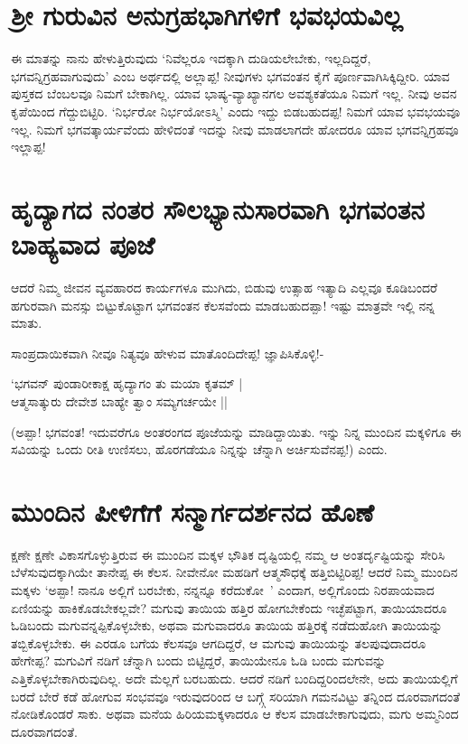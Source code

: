 \section*{ಶ್ರೀ ಗುರುವಿನ ಅನುಗ್ರಹಭಾಗಿಗಳಿಗೆ ಭವಭಯವಿಲ್ಲ}

ಈ ಮಾತನ್ನು ನಾನು ಹೇಳುತ್ತಿರುವುದು `ನಿವೆಲ್ಲರೂ ಇದಕ್ಕಾಗಿ ದುಡಿಯಲೇಬೇಕು, ಇಲ್ಲದಿದ್ದರೆ, ಭಗವನ್ನಿಗ್ರಹವಾಗುವುದು' ಎಂಬ ಅರ್ಥದಲ್ಲಿ ಅಲ್ಲಾಪ್ಪ! ನೀವುಗಳು ಭಗವಂತನ ಕೈಗೆ ಪೂರ್ಣವಾಗಿಸಿಕ್ಕಿದ್ದೀರಿ. ಯಾವ ಪುಸ್ತಕದ ಬೆಂಬಲವೂ ನಿಮಗೆ ಬೇಕಾಗಿಲ್ಲ. ಯಾವ ಭಾಷ್ಯ-ವ್ಯಾಖ್ಯಾನಗಲ ಅವಶ್ಯಕತೆಯೂ ನಿಮಗೆ ಇಲ್ಲ. ನೀವು ಅವನ ಕೃಪೆಯಿಂದ ಗೆದ್ದುಬಿಟ್ಟಿರಿ. `ನಿರ್ಭರೋ ನಿರ್ಭಯೋಽಸ್ಮಿ'\label{115} ಎಂದು ಇದ್ದು ಬಿಡಬಹುದಪ್ಪ! ನಿಮಗೆ ಯಾವ ಭವಭಯವೂ ಇಲ್ಲ. ನಿಮಗೆ ಭಗವತ್ಕಾರ್ಯವೆಂದು ಹೇಳಿದಂತೆ ಇದನ್ನು ನೀವು ಮಾಡಲಾಗದೇ ಹೋದರೂ ಯಾವ ಭಗವನ್ನಿಗ್ರಹವೂ ಇಲ್ಲಾಪ್ಪ!

\section*{ಹೃದ್ಯಾಗದ ನಂತರ ಸೌಲಭ್ಯಾನುಸಾರವಾಗಿ ಭಗವಂತನ ಬಾಹ್ಯವಾದ ಪೂಜೆ}

ಆದರೆ ನಿಮ್ಮ ಜೀವನ ವ್ಯವಹಾರದ ಕಾರ್ಯಗಳೂ ಮುಗಿದು, ಬಿಡುವು ಉತ್ಸಾಹ ಇತ್ಯಾದಿ ಎಲ್ಲವೂ ಕೂಡಿಬಂದರೆ ಹಗುರವಾಗಿ ಮನಸ್ಸು ಬಿಟ್ಟುಕೊಟ್ಟಾಗ ಭಗವಂತನ ಕೆಲಸವೆಂದು ಮಾಡಬಹುದಪ್ಪಾ! ಇಷ್ಟು ಮಾತ್ರವೇ ಇಲ್ಲಿ ನನ್ನ ಮಾತು.

ಸಾಂಪ್ರದಾಯಿಕವಾಗಿ ನೀವೂ ನಿತ್ಯವೂ ಹೇಳುವ ಮಾತೊಂದಿದೇಪ್ಪ! ಜ್ಞಾಪಿಸಿಕೊಳ್ಳಿ!-

\begin{shloka}
`ಭಗವನ್ ಪುಂಡಾರೀಕಾಕ್ಷ ಹೃದ್ಯಾಗಂ ತು ಮಯಾ ಕೃತಮ್ |\\
ಆತ್ಮಸಾತ್ಕುರು ದೇವೇಶ ಬಾಹ್ಯೇ ತ್ವಾಂ ಸಮ್ಯಗರ್ಚಯೇ ||
\end{shloka}

(ಅಪ್ಪಾ! ಭಗವಂತ! ಇದುವರೆಗೂ ಅಂತರಂಗದ ಪೂಜೆಯನ್ನು ಮಾಡಿದ್ದಾಯಿತು. ಇನ್ನು ನಿನ್ನ ಮುಂದಿನ ಮಕ್ಕಳಿಗೂ ಈ ಸವಿಯನ್ನು ಒಂದು ರೀತಿ ಉಣಿಸಲು, ಹೊರಗಡೆಯೂ ನಿನ್ನನ್ನು ಚೆನ್ನಾಗಿ ಅರ್ಚಿಸುವೆನಪ್ಪ!) ಎಂದು.

\section*{ಮುಂದಿನ ಪೀಳಿಗೆಗೆ ಸನ್ಮಾರ್ಗದರ್ಶನದ ಹೊಣೆ}

ಕ್ಷಣೇ ಕ್ಷಣೇ ವಿಕಾಸಗೊಳ್ಳುತ್ತಿರುವ ಈ ಮುಂದಿನ ಮಕ್ಕಳ ಭೌತಿಕ ದೃಷ್ಟಿಯಲ್ಲಿ ನಮ್ಮ ಆ ಅಂತರ್ದೃಷ್ಟಿಯನ್ನು ಸೇರಿಸಿ ಬೆಳೆಸುವುದಕ್ಕಾಗಿಯೇ ತಾನೇಪ್ಪ ಈ ಕೆಲಸ. ನೀವೇನೋ ಮಹಡಿಗೆ ಆತ್ಮಸೌಧಕ್ಕೆ ಹತ್ತಿಬಿಟ್ಟಿರಿಪ್ಪ! ಆದರೆ ನಿಮ್ಮ ಮುಂದಿನ ಮಕ್ಕಳು `ಅಪ್ಪಾ! ನಾನೂ ಅಲ್ಲಿಗೆ ಬರಬೇಕು, ನನ್ನನ್ನೂ ಕರೆದುಕೋ~' ಎಂದಾಗ, ಅಲ್ಲಿಗೊಂದು ನಿರಪಾಯವಾದ ಏಣಿಯನ್ನು ಹಾಕಿಕೊಡಬೇಕಲ್ಲವೇ? ಮಗುವು ತಾಯಿಯ ಹತ್ತಿರ ಹೋಗಬೇಕೆಂದು ಇಚ್ಛೆಪಟ್ಟಾಗ, ತಾಯಿಯಾದರೂ ಓಡಿಬಂದು ಮಗುವನ್ನಪ್ಪಿಕೊಳ್ಳಬೇಕು, ಅಥವಾ ಮಗುವಾದರೂ ತಾಯಿಯ ಹತ್ತಿರಕ್ಕೆ ನಡೆದುಹೋಗಿ ತಾಯಿಯನ್ನು ತಬ್ಬಿಕೊಳ್ಳಬೇಕು. ಈ ಎರಡೂ ಬಗೆಯ ಕೆಲಸವೂ ಆಗದಿದ್ದರೆ, ಆ ಮಗುವು ತಾಯಿಯನ್ನು ತಲಪುವುದಾದರೂ ಹೇಗೇಪ್ಪ? ಮಗುವಿಗೆ ನಡಿಗೆ ಚೆನ್ನಾಗಿ ಬಂದು ಬಿಟ್ಟಿದ್ದರೆ, ತಾಯಿಯೇನೂ ಓಡಿ ಬಂದು ಮಗುವನ್ನು ಎತ್ತಿಕೊಳ್ಳಬೇಕಾಗಿರುವುದಿಲ್ಲ. ಅದೇ ಮೆಲ್ಲಗೆ ಬರಬಹುದು. ಆದರೆ ನಡಿಗೆ ಬಂದಿದ್ದರಿಂದಲೇನೇ, ಅದು ತಾಯಿಯಲ್ಲಿಗೆ ಬರದೆ ಬೇರೆ ಕಡೆ ಹೋಗುವ ಸಂಭವವೂ ಇರುವುದರಿಂದ ಆ ಬಗ್ಗ್ಗೆ ಸರಿಯಾಗಿ ಗಮನವಿಟ್ಟು ತನ್ನಿಂದ ದೂರವಾಗದಂತೆ ನೋಡಿಕೊಂಡರೆ ಸಾಕು. ಅಥವಾ ಮನೆಯ ಹಿರಿಯಮಕ್ಕಳಾದರೂ ಆ ಕೆಲಸ ಮಾಡಬೇಕಾಗುವುದು, ಮಗು ಅಮ್ಮನಿಂದ ದೂರವಾಗದಂತೆ.

